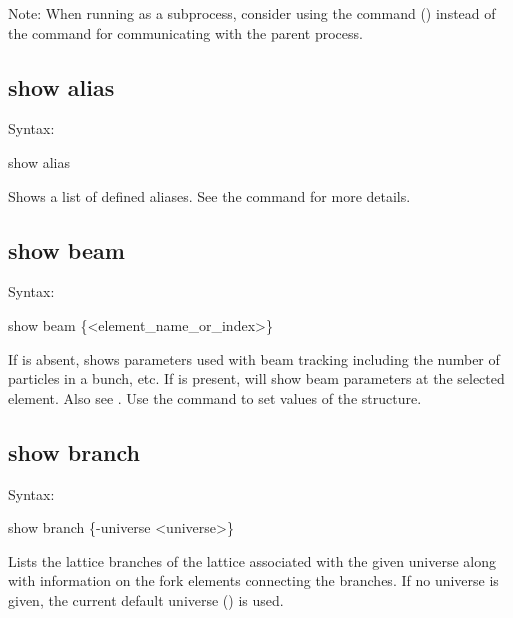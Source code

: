 {{{{{Note: When running \tao as a subprocess, consider using the  command
() instead of the  command for communicating with the parent
process.



\subsection{show alias}
\label{s:show.alias}

Syntax:
\begin{example}
  show alias
\end{example}

Shows a list of defined aliases. See the  command for more details.


\subsection{show beam}
\label{s:show.beam}

Syntax:
\begin{example}
  show beam \{<element_name_or_index>\}
\end{example}

If  is absent,  shows parameters used with beam
tracking including the number of particles in a bunch, etc.  If
 is present,  will show beam parameters at the
selected element. Also see .  Use the  command to set
values of the  structure.


\subsection{show branch}
\label{s:show.branch}

Syntax:
\begin{example}
  show branch \{-universe <universe>\}
\end{example}


Lists the lattice branches of the lattice associated with the given universe along with
information on the fork elements connecting the branches.  If no universe is given, the
current default universe () is used.

}}}}}
